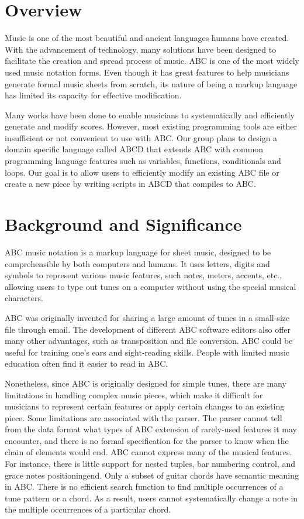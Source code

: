\section{Overview}

Music is one of the most beautiful and ancient languages humans have created. With the advancement of technology, many solutions have been designed to facilitate the creation and spread process of music. ABC is one of the most widely used music notation forms. Even though it has great features to help musicians generate formal music sheets from scratch, its nature of being a markup language has limited its capacity for effective modification.

Many works have been done to enable musicians to systematically and efficiently generate and modify scores. However, most existing programming tools are either insufficient or not convenient to use with ABC. Our group plans to design a domain specific language called ABCD that extends ABC with common programming language features such as variables, functions, conditionals and loops. Our goal is to allow users to efficiently modify an existing ABC file or create a new piece by writing scripts in ABCD that compiles to ABC.

\section{Background and Significance}

ABC music notation is a markup language for sheet music, designed to be comprehensible by both computers and humans. It uses letters, digits and symbols to represent various music features, such notes, meters, accents, etc., allowing users to type out tunes on a computer without using the special musical characters\cite{Walshaw11}.

ABC was originally invented for sharing a large amount of tunes in a small-size file through email\cite{Johnson17}. The development of different ABC software editors also offer many other advantages, such as transposition and file conversion. ABC could be useful for training one's ears and sight-reading skills. People with limited music education often find it easier to read in ABC\cite{Mary14}. 

Nonetheless, since ABC is originally designed for simple tunes, there are many limitations in handling complex music pieces, which make it difficult for musicians to represent certain features or apply certain changes to an existing piece. Some limitations are associated with the parser. The parser cannot tell from the data format what types of ABC extension of rarely-used features it may encounter, and there is no formal specification for the parser to know when the chain of elements would end\cite{Cuthbert14}. ABC cannot express many of the musical features. For instance, there is little support for nested tuples, bar numbering control, and grace notes positioningend\cite{Cuthbert14}. Only a subset of guitar chords have semantic meaning in ABC\cite{Chambers02}. There is no efficient search function to find multiple occurrences of a tune pattern or a chord. As a result, users cannot systematically change a note in the multiple occurrences of a particular chord. 

